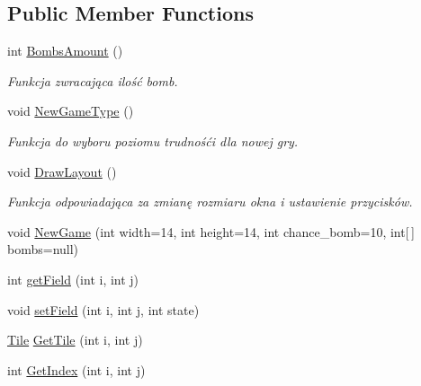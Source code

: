 \subsection*{Public Member Functions}
\begin{DoxyCompactItemize}
\item 
\mbox{\label{class_saper_1_1_game_a68a874323b134ee545e72de1d332f11a}} 
int \mbox{\hyperlink{class_saper_1_1_game_a68a874323b134ee545e72de1d332f11a}{Bombs\+Amount}} ()
\begin{DoxyCompactList}\small\item\em Funkcja zwracająca ilość bomb. \end{DoxyCompactList}\item 
\mbox{\label{class_saper_1_1_game_a1f14c9d69d6267494ca48f146c9e34c7}} 
void \mbox{\hyperlink{class_saper_1_1_game_a1f14c9d69d6267494ca48f146c9e34c7}{New\+Game\+Type}} ()
\begin{DoxyCompactList}\small\item\em Funkcja do wyboru poziomu trudnośći dla nowej gry. \end{DoxyCompactList}\item 
\mbox{\label{class_saper_1_1_game_ae9bce8a78f549e7e728c6b1f290c9d7e}} 
void \mbox{\hyperlink{class_saper_1_1_game_ae9bce8a78f549e7e728c6b1f290c9d7e}{Draw\+Layout}} ()
\begin{DoxyCompactList}\small\item\em Funkcja odpowiadająca za zmianę rozmiaru okna i ustawienie przycisków. \end{DoxyCompactList}\item 
void \mbox{\hyperlink{class_saper_1_1_game_a77b5cf2c44e21908cbbe17622ef1c2db}{New\+Game}} (int width=14, int height=14, int chance\+\_\+bomb=10, int\mbox{[}$\,$\mbox{]} bombs=null)
\item 
int \mbox{\hyperlink{class_saper_1_1_game_a6ad3e962eca53c2dbf6b499a469fa5f2}{get\+Field}} (int i, int j)
\item 
void \mbox{\hyperlink{class_saper_1_1_game_aa62b5814c25458101aaf843271dcff83}{set\+Field}} (int i, int j, int state)
\item 
\mbox{\hyperlink{class_saper_1_1_tile}{Tile}} \mbox{\hyperlink{class_saper_1_1_game_aad59b3c8d1d9ca582a9b508aad99631a}{Get\+Tile}} (int i, int j)
\item 
int \mbox{\hyperlink{class_saper_1_1_game_a036a73f7d4b60dada7ec45c9a712eff4}{Get\+Index}} (int i, int j)

\end{DoxyCompactItemize}
